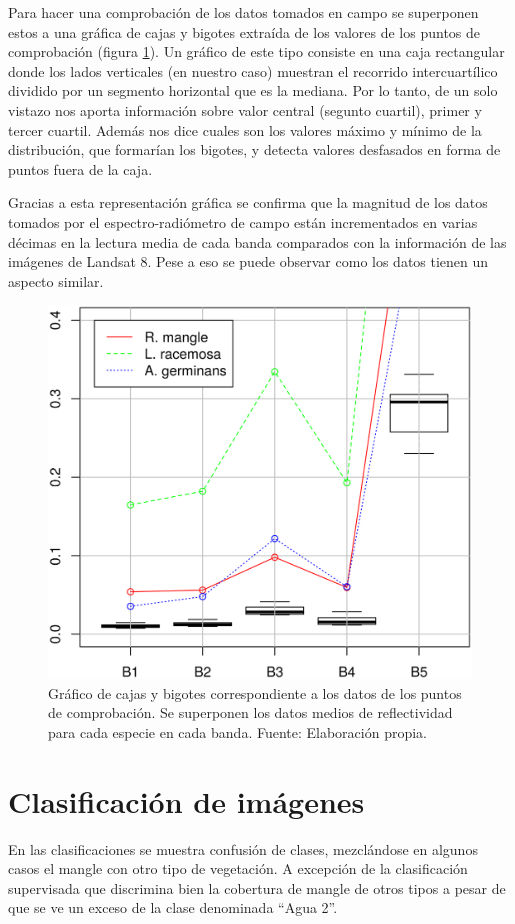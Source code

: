 Para hacer una comprobación de los datos tomados en campo se superponen estos a una gráfica de cajas y bigotes extraída de los valores de los puntos de comprobación (figura \ref{fig:grafica_comprob}). Un gráfico de este tipo consiste en una caja rectangular donde los lados verticales (en nuestro caso) muestran el recorrido intercuartílico dividido por un segmento horizontal que es la mediana. Por lo tanto, de un solo vistazo nos aporta información sobre valor central (segunto cuartil), primer y tercer cuartil. Además nos dice cuales son los valores máximo y mínimo de la distribución, que formarían los bigotes, y detecta valores desfasados en forma de puntos fuera de la caja.\Sep

Gracias a esta representación gráfica se confirma que la magnitud de los datos tomados por el espectro-radiómetro de campo están incrementados en varias décimas en la lectura media de cada banda comparados con la información de las imágenes de Landsat 8. Pese a eso se puede observar como los datos tienen un aspecto similar.

\begin{figure}
	\centering
	\includegraphics[width=0.8\linewidth]{./Imagenes/grafica_comprob.eps}
	\caption[Gráfico de puntos de comprobación]{Gráfico de cajas y bigotes correspondiente a los datos de los puntos de comprobación. Se superponen los datos medios de reflectividad para cada especie en cada banda. Fuente: Elaboración propia.}
	\label{fig:grafica_comprob}
\end{figure}


\section{Clasificación de imágenes}
En las clasificaciones se muestra confusión de clases, mezclándose en algunos casos el mangle con otro tipo de vegetación. A excepción de la clasificación supervisada que discrimina bien la cobertura de mangle de otros tipos a pesar de que se ve un exceso de la clase denominada ``Agua 2''.\Sep

